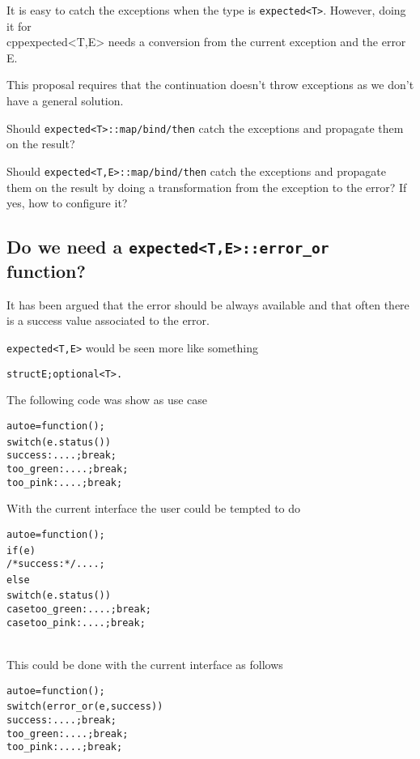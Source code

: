 \documentclass[a4paper,10pt]{article}
\newcommand{\cpp}[1]{\lstinline{#1}}
\begin{document}
It is easy to catch the exceptions when the type is \cpp{expected<T>}. However, doing it for \\cpp{expected<T,E>} needs a conversion from the current exception and the error E.

This proposal requires that the continuation doesn't throw exceptions as we don't have a general solution.

Should  \cpp{expected<T>::map/bind/then} catch the exceptions and propagate them on the result?

Should  \cpp{expected<T,E>::map/bind/then} catch the exceptions and propagate them on the result by doing a transformation from the exception to the error? If yes, how to configure it?

\subsection{Do we need a \cpp{expected<T,E>::error_or} function?}

It has been argued that the error should be always available and that often there is a success value associated to the error.

\cpp{expected<T,E>} would be seen more like something  

\begin{alltt}
struct { E; optional<T> }. 
\end{alltt}

\noindent
The following code was show as use case

\begin{alltt}
auto e = function();
switch (e.status()) {
  success: ....; break;
  too_green: ....; break;
  too_pink: ....; break;
} 
\end{alltt}

\noindent
With the current interface the user could be tempted to do

\begin{alltt}
auto e = function();
if (e) {
  /*success:*/ ....;
} else {
  switch (e.status()) {
  case too_green: ....; break;
  case too_pink: ....; break;
  }
} 
\end{alltt}

\noindent
This could be done with the current interface as follows

\begin{alltt}
auto e = function();
switch (error_or(e, success)) {
  success: ....; break;
  too_green: ....; break;
  too_pink: ....; break;
} 
\end{alltt}
\end{document}
